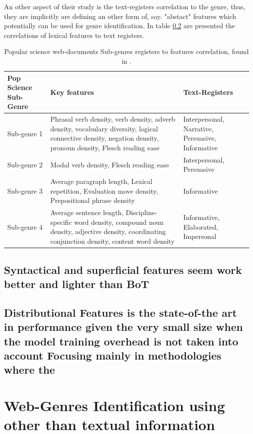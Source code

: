 An other aspect of their study is the text-registers correlation to the genre, thus, they are implicitly are defining an other form of, say. "abstact" features which potentially can be used for genre identification. In table \ref{} are presented the correlations of lexical features to text registers.

\begin{table}[t]
	\center
	\caption {Popular science web-documents Sub-genres registers to features correlation, found in \parencite{lieungnapar2017genre}.}\label{chap:relevant_work:tbl:pop_science_registers_features}
	\begin{tabular}{p{4cm}p{7cm}p{3cm}}
		\hline
		Pop Science Sub-Genre & Key features & Text-Registers \\
		\hline
		 Sub-genre 1 & Phrasal verb density, verb density, adverb density, vocabulary diversity, logical connective density, negation density, pronoun density, Flesch reading ease & Interpersonal, Narrative, Persuasive, Informative \\
         Sub-genre 2 & Modal verb density, Flesch reading ease & Interpersonal, Persuasive \\
         Sub-genre 3 & Average paragraph length, Lexical repetition, Evaluation move density, Prepositional phrase density & Informative\\
         Sub-genre 4 & Average sentence length, Discipline-specific word density, compound noun density, adjective density, coordinating conjunction density, content word density & Informative, Elaborated, Impersonal  \\
  		\hline
	\end{tabular}
\end{table}


\subsection{Syntactical and superficial features seem work better and lighter than BoT}

\subsection{Distributional Features is the state-of-the art in performance given the very small size when the model training overhead is not taken into account Focusing mainly in methodologies where the }



\section{Web-Genres Identification using other than textual information}\label{chap:relevant_work:sec:intro}



